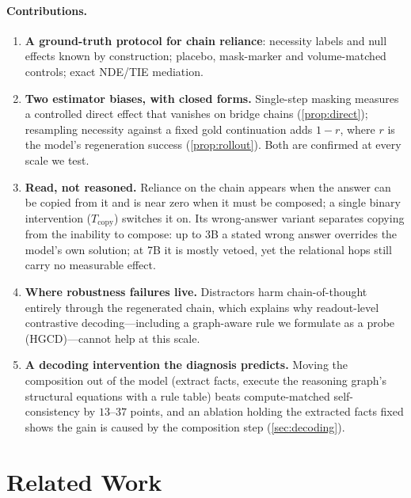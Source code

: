 \documentclass[11pt]{article}
\newcommand{\hgcd}{\textsc{HGCD}}
\begin{document}
\paragraph{Contributions.}
\begin{enumerate}[leftmargin=*,itemsep=1pt]
\item \textbf{A ground-truth protocol for chain reliance}: necessity labels and null effects known
by construction; placebo, mask-marker and volume-matched controls; exact NDE/TIE mediation.
\item \textbf{Two estimator biases, with closed forms.} Single-step masking measures a controlled
direct effect that vanishes on bridge chains (\cref{prop:direct}); resampling necessity against a
fixed gold continuation adds $1-r$, where $r$ is the model's regeneration success
(\cref{prop:rollout}). Both are confirmed at every scale we test.
\item \textbf{Read, not reasoned.} Reliance on the chain appears when the answer can be
copied from it and is near zero when it must be composed; a single binary intervention
($T_{\text{copy}}$) switches it on. Its wrong-answer variant separates copying from the inability
to compose: up to 3B a stated wrong answer overrides the model's own solution; at 7B it is mostly
vetoed, yet the relational hops still carry no measurable effect.
\item \textbf{Where robustness failures live.} Distractors harm chain-of-thought entirely through
the regenerated chain, which explains why readout-level contrastive decoding---including a
graph-aware rule we formulate as a probe (\hgcd{})---cannot help at this scale.
\item \textbf{A decoding intervention the diagnosis predicts.} Moving the composition out of the
model (extract facts, execute the reasoning graph's structural equations with a rule table) beats
compute-matched self-consistency by $13$--$37$ points, and an ablation holding the extracted facts
fixed shows the gain is caused by the composition step (\cref{sec:decoding}).
\end{enumerate}

\section{Related Work}
\end{document}
